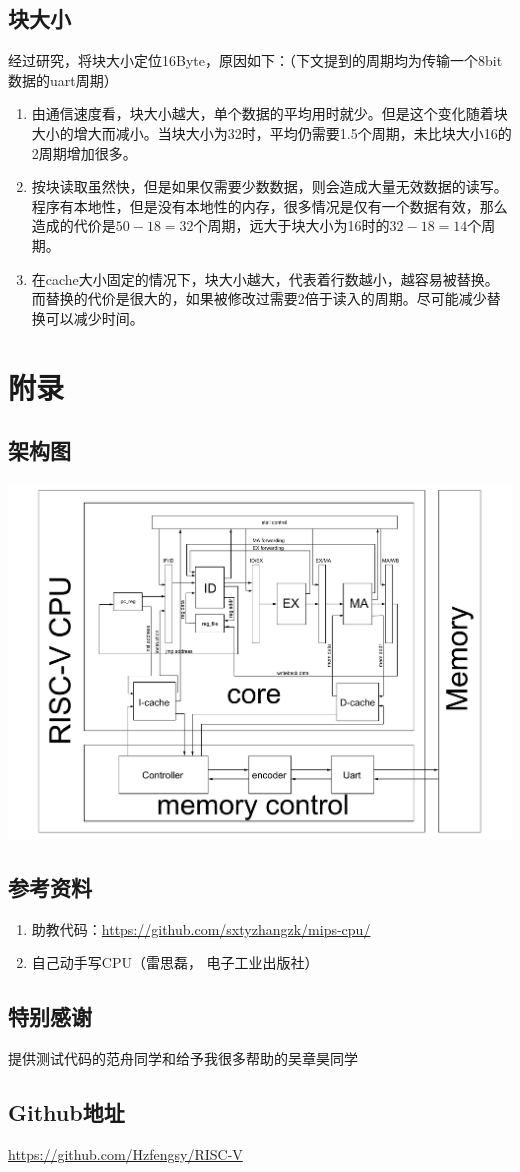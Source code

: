 \documentclass[11pt, a4paper]{article}
\begin{document}
  \subsection{块大小}
  经过研究，将块大小定位16Byte，原因如下：（下文提到的周期均为传输一个8bit数据的uart周期）
  \begin{enumerate}
  	\item 由通信速度看，块大小越大，单个数据的平均用时就少。但是这个变化随着块大小的增大而减小。当块大小为32时，平均仍需要1.5个周期，未比块大小16的2周期增加很多。
  	\item 按块读取虽然快，但是如果仅需要少数数据，则会造成大量无效数据的读写。程序有本地性，但是没有本地性的内存，很多情况是仅有一个数据有效，那么造成的代价是$50-18=32$个周期，远大于块大小为16时的$32-18=14$个周期。
  	\item 在cache大小固定的情况下，块大小越大，代表着行数越小，越容易被替换。而替换的代价是很大的，如果被修改过需要2倍于读入的周期。尽可能减少替换可以减少时间。
  \end{enumerate}
  
\section{附录}
	\subsection{架构图}
		\includegraphics[width=6in]{cpu}
	\subsection{参考资料}
		\begin{enumerate}
			\item 助教代码：\url{https://github.com/sxtyzhangzk/mips-cpu/}
			\item 自己动手写CPU（雷思磊， 电子工业出版社）
		\end{enumerate}	
	\subsection{特别感谢}
		提供测试代码的范舟同学和给予我很多帮助的吴章昊同学
	\subsection{Github地址}
		\url{https://github.com/Hzfengsy/RISC-V}
\end{document}
